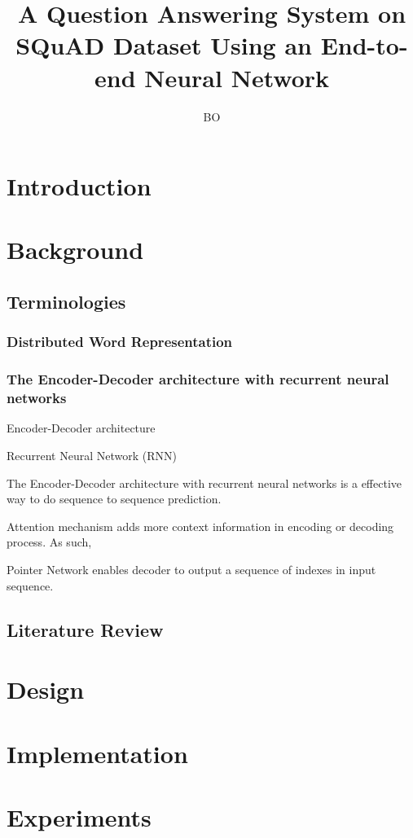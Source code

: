 \documentclass[modernstyle,12pt]{sjsuthesis}
\title{A Question Answering System on SQuAD Dataset Using an End-to-end Neural Network}
\author{BO}{LI}
\theoremstyle{definition}
\begin{document}
\raggedright          %
\parindent=30pt       %




\chapter{Introduction}
\chapter{Background}
\section{Terminologies}

\subsection{Distributed Word Representation}

\subsection{The Encoder-Decoder architecture with recurrent neural networks}

Encoder-Decoder architecture

Recurrent Neural Network (RNN)

The Encoder-Decoder architecture with recurrent neural networks is a effective way to do sequence to sequence prediction.

Attention mechanism adds more context information in encoding or decoding process. As such,


Pointer Network enables decoder to output a sequence of indexes in input sequence.

\section{Literature Review}
\chapter{Design}
\chapter{Implementation}
\chapter{Experiments}
\end{document}
